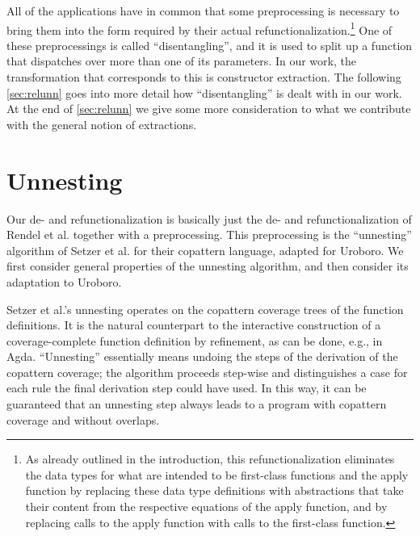 All of the applications have in common that some preprocessing is necessary to bring them into the form required by their actual refunctionalization.\footnote{As already outlined in the introduction, this refunctionalization eliminates the data types for what are intended to be first-class functions and the apply function by replacing these data type definitions with abstractions that take their content from the respective equations of the apply function, and by replacing calls to the apply function with calls to the first-class function.} One of these preprocessings is called ``disentangling'', and it is used to split up a function that dispatches over more than one of its parameters. In our work, the transformation that corresponds to this is constructor extraction. The following \autoref{sec:relunn} goes into more detail how ``disentangling'' is dealt with in our work. At the end of \autoref{sec:relunn} we give some more consideration to what we contribute with the general notion of extractions.

\section{Unnesting}
\label{sec:relunn}

Our de- and refunctionalization is basically just the de- and refunctionalization of Rendel et al.\cite{rendel15automatic} together with a preprocessing. This preprocessing is the ``unnesting'' algorithm of Setzer et al.\cite{setzer14unnesting} for their copattern language, adapted for Uroboro. We first consider general properties of the unnesting algorithm, and then consider its adaptation to Uroboro.

Setzer et al.'s\cite{setzer14unnesting} unnesting operates on the copattern coverage trees of the function definitions. It is the natural counterpart to the interactive construction of a coverage-complete function definition by refinement, as can be done, e.g., in Agda. ``Unnesting'' essentially means undoing the steps of the derivation of the copattern coverage; the algorithm proceeds step-wise and distinguishes a case for each rule the final derivation step could have used. In this way, it can be guaranteed that an unnesting step always leads to a program with copattern coverage and without overlaps.

